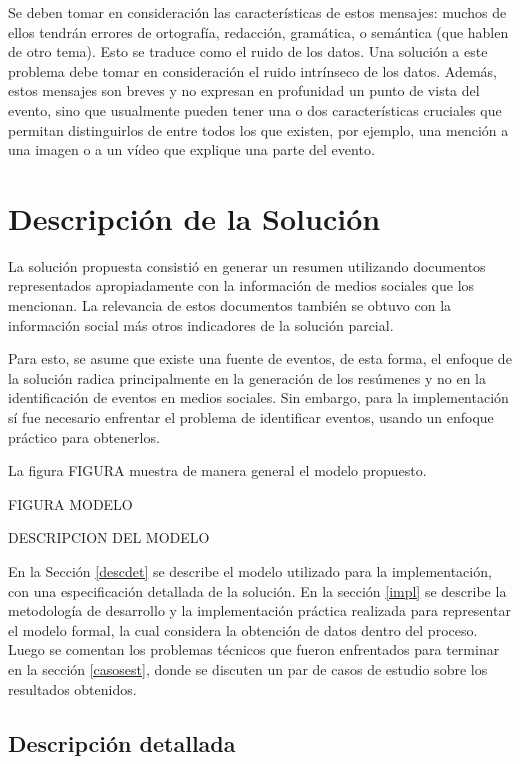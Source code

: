 \documentclass[upright, contnum]{umemoria}
\begin{document}
  Se deben tomar en consideración las características de estos
  mensajes: muchos de ellos tendrán errores de ortografía, redacción,
  gramática, o semántica (que hablen de otro tema). Esto se traduce
  como el ruido de los datos. Una solución a este problema debe tomar
  en consideración el ruido intrínseco de los datos. Además, estos
  mensajes son breves y no expresan en profunidad un punto de vista
  del evento, sino que usualmente pueden tener una o dos
  características cruciales que permitan distinguirlos de entre todos
  los que existen, por ejemplo, una mención a una imagen o a un
  vídeo que explique una parte del evento.


\chapter{Descripción de la Solución}
\label{sec-4}


  La solución propuesta consistió en generar un resumen utilizando
  documentos representados apropiadamente con la información de medios
  sociales que los mencionan. La relevancia de estos documentos
  también se obtuvo con la información social más otros indicadores de
  la solución parcial. 

  Para esto, se asume que existe una fuente de eventos, de esta forma,
  el enfoque de la solución radica principalmente en la generación de
  los resúmenes y no en la identificación de eventos en medios
  sociales. Sin embargo, para la implementación sí fue necesario
  enfrentar el problema de identificar eventos, usando un enfoque
  práctico para obtenerlos.

  La figura FIGURA muestra de manera general el modelo propuesto.

  FIGURA MODELO

  DESCRIPCION DEL MODELO

  En la Sección \ref{descdet} se describe el modelo utilizado para la
  implementación, con una especificación detallada de la solución. En la
  sección \ref{impl} se describe la metodología de desarrollo y la
  implementación práctica realizada para representar el modelo
  formal, la cual considera la obtención de datos dentro del
  proceso. Luego se comentan los problemas técnicos que fueron
  enfrentados para terminar en la sección \ref{casosest}, donde se discuten
  un par de casos de estudio sobre los resultados obtenidos.

\section{Descripción detallada}
\label{sec-4.1}
\end{document}
